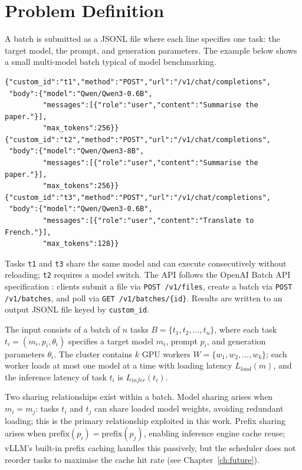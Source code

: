 \documentclass[logo,bsc,singlespacing,parskip,online]{infthesis}
\begin{document}
\clearpage
\section{Problem Definition}
\label{sec:problem_definition}

A batch is submitted as a JSONL file where each line specifies one task: the target model, the prompt, and generation parameters. The example below shows a small multi-model batch typical of model benchmarking.

\begin{lstlisting}[language={},basicstyle=\ttfamily\small,frame=single,numbers=none]
{"custom_id":"t1","method":"POST","url":"/v1/chat/completions",
 "body":{"model":"Qwen/Qwen3-0.6B",
         "messages":[{"role":"user","content":"Summarise the paper."}],
         "max_tokens":256}}
{"custom_id":"t2","method":"POST","url":"/v1/chat/completions",
 "body":{"model":"Qwen/Qwen3-8B",
         "messages":[{"role":"user","content":"Summarise the paper."}],
         "max_tokens":256}}
{"custom_id":"t3","method":"POST","url":"/v1/chat/completions",
 "body":{"model":"Qwen/Qwen3-0.6B",
         "messages":[{"role":"user","content":"Translate to French."}],
         "max_tokens":128}}
\end{lstlisting}

Tasks \texttt{t1} and \texttt{t3} share the same model and can execute consecutively without reloading; \texttt{t2} requires a model switch. The API follows the OpenAI Batch API specification \citep{openai_batch_api}: clients submit a file via \texttt{POST /v1/files}, create a batch via \texttt{POST /v1/batches}, and poll via \texttt{GET /v1/batches/\{id\}}. Results are written to an output JSONL file keyed by \texttt{custom\_id}.

The input consists of a batch of $n$ tasks $B = \{t_1, t_2, \ldots, t_n\}$, where each task $t_i = (m_i, p_i, \theta_i)$ specifies a target model $m_i$, prompt $p_i$, and generation parameters $\theta_i$. The cluster contains $k$ GPU workers $W = \{w_1, w_2, \ldots, w_k\}$; each worker loads at most one model at a time with loading latency $L_{load}(m)$, and the inference latency of task $t_i$ is $L_{infer}(t_i)$.

Two sharing relationships exist within a batch. Model sharing arises when $m_i = m_j$: tasks $t_i$ and $t_j$ can share loaded model weights, avoiding redundant loading; this is the primary relationship exploited in this work. Prefix sharing arises when $\text{prefix}(p_i) = \text{prefix}(p_j)$, enabling inference engine cache reuse; vLLM's built-in prefix caching handles this passively, but the scheduler does not reorder tasks to maximise the cache hit rate (see Chapter~\ref{ch:future}).
\end{document}
